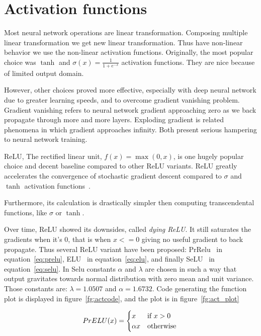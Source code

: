 \documentclass[times, utf8, diplomski, english]{fer}
\begin{document}
\section{Activation functions}
\label{sec:activation}

Most neural network operations are linear transformation. Composing multiple linear transformation we get new linear transformation. Thus have non-linear behavior we use the non-linear activation functions. Originally, the most popular choice was $\tanh$ and $\sigma(x) = \frac{1}{1 + e^{-x}} $ activation functions. They are nice because of limited output domain. 

However, other choices proved more effective, especially with deep neural network due to greater learning speeds, and to overcome gradient vanishing problem. Gradient vanishing refers to neural network gradient approaching zero as we back propagate through more and more layers. Exploding gradient is related phenomena in which gradient approaches infinity. Both present serious hampering to neural network training.

ReLU, The rectified linear unit, $f(x) = \max(0, x)$,  is one hugely popular choice and decent baseline compared to other ReLU variants. ReLU greatly accelerates the convergence of stochastic gradient descent compared to $\sigma$ and $\tanh$ activation functions~\citep{NIPS2012_4824}. 

Furthermore, its calculation is drastically simpler then computing transcendental functions, like $\sigma$ or $\tanh$.

Over time, ReLU showed its downsides, called \textit{dying ReLU}. It still saturates the gradients when it's 0, that is when $x <= 0$ giving no useful gradient to back propagate. Thus several ReLU variant have been proposed: PrRelu~\citep{prelu} in equation~\ref{eq:prelu}, ELU~\citep{elu} in equation~\ref{eq:elu}, and finally SeLU~\citep{selu} in equation~\ref{eq:selu}. In Selu constants $\alpha$ and $\lambda$ are chosen in such a way that output gravitates towards normal distribution with zero mean and unit variance. Those constants are: $\lambda = 1.0507$ and $\alpha = 1.6732$. 
Code generating the function plot is displayed in figure~\ref{fg:actcode}, and the plot is in figure~\ref{fg:act_plot}

\begin{equation}    
\label{eq:prelu}
PrELU(x)=
\begin{cases}
x & \text{if}\ x>0 \\
\alpha x & \text{otherwise}
\end{cases}\\
\end{equation}
\end{document}
